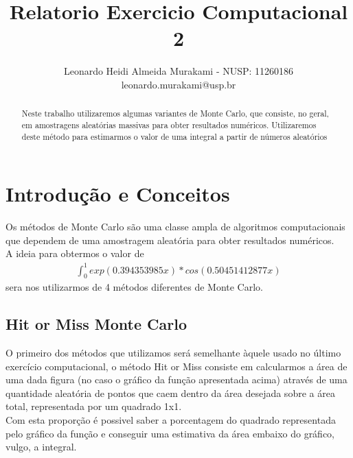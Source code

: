 \documentclass[twocolumn,amsmath,amssymb,floatfix]{revtex4}
\begin{document}

\title{Relatorio Exercicio Computacional 2}

\author{Leonardo Heidi Almeida Murakami - NUSP: 11260186 \\\small leonardo.murakami@usp.br} 

\begin{abstract}
\baselineskip 11pt
Neste trabalho utilizaremos algumas variantes de Monte Carlo, que consiste, no geral, em amostragens aleatórias massivas para obter resultados numéricos. Utilizaremos deste método para estimarmos o valor de uma integral a partir de números aleatórios
\end{abstract}

\maketitle
\section{Introdução e Conceitos}

\indent Os métodos de Monte Carlo são uma classe ampla de algoritmos computacionais que dependem de uma amostragem aleatória para obter resultados numéricos. 
\\\indent A ideia para obtermos o valor de 
\begin{eqnarray}
  \int^1_0 exp(0.394353985x)*cos(0.50451412877x)
\end{eqnarray}
sera nos utilizarmos de 4 métodos diferentes de Monte Carlo.
\subsection{Hit or Miss Monte Carlo}
O primeiro dos métodos que utilizamos será semelhante àquele usado no último exercício computacional, o método Hit or Miss consiste em calcularmos a área de uma dada figura (no caso o gráfico da função apresentada acima) através de uma quantidade aleatória de pontos que caem dentro da área desejada sobre a área total, representada por um quadrado 1x1. \\
\indent Com esta proporção é possivel saber a porcentagem do quadrado representada pelo gráfico da função e conseguir uma estimativa da área embaixo do gráfico, vulgo, a integral.
\end{document}
